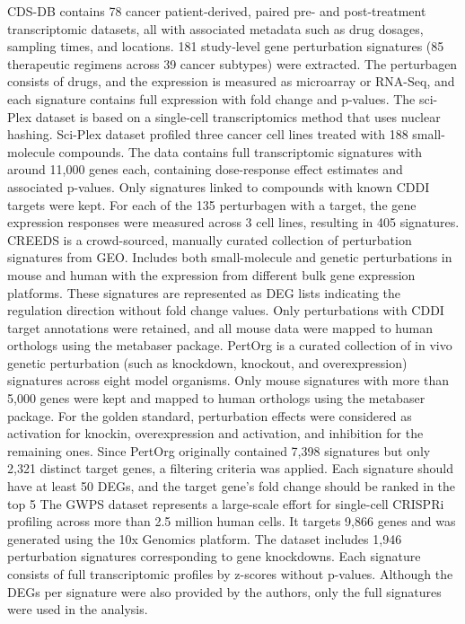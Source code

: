 CDS-DB contains 78 cancer patient‐derived, paired pre- and post-treatment transcriptomic datasets, all with associated metadata such as drug dosages, sampling times, and locations. 181 study‐level gene perturbation signatures (85 therapeutic regimens across 39 cancer subtypes) were extracted. The perturbagen consists of drugs, and the expression is measured as microarray or RNA-Seq, and each signature contains full expression with fold change and p-values. 
The sci-Plex dataset is based on a single-cell transcriptomics method that uses nuclear hashing. Sci-Plex dataset profiled three cancer cell lines treated with 188 small-molecule compounds. The data contains full transcriptomic signatures with around 11,000 genes each, containing dose-response effect estimates and associated p-values. Only signatures linked to compounds with known CDDI targets were kept. For each of the 135 perturbagen with a target, the gene expression responses were measured across 3 cell lines, resulting in 405 signatures. 
CREEDS is a crowd-sourced, manually curated collection of perturbation signatures from GEO. Includes both small-molecule and genetic perturbations in mouse and human with the expression from different bulk gene expression platforms. These signatures are represented as DEG lists indicating the regulation direction without fold change values. Only perturbations with CDDI target annotations were retained, and all mouse data were mapped to human orthologs using the metabaser package.
PertOrg is a curated collection of in vivo genetic perturbation (such as knockdown, knockout, and overexpression) signatures across eight model organisms. Only mouse signatures with more than 5,000 genes were kept and mapped to human orthologs using the metabaser package. For the golden standard, perturbation effects were considered as activation for knockin, overexpression and activation, and inhibition for the remaining ones. Since PertOrg originally contained 7,398 signatures but only 2,321 distinct target genes, a filtering criteria was applied. Each signature should have at least 50 DEGs, and the target gene’s fold change should be ranked in the top 5%
The GWPS dataset represents a large-scale effort for single-cell CRISPRi profiling across more than 2.5 million human cells. It targets 9,866 genes and was generated using the 10x Genomics platform. The dataset includes 1,946 perturbation signatures corresponding to gene knockdowns. Each signature consists of full transcriptomic profiles by z-scores without p-values. Although the DEGs per signature were also provided by the authors, only the full signatures were used in the analysis.


